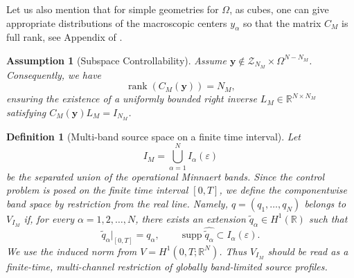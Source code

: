 \documentclass[11pt,a4paper]{article}
\numberwithin{equation}{section}
\newtheorem{assumption}{Assumption}
\newtheorem{definition}{Definition}
\newcommand{\rankrev}[1]{{\color{rankclarification}#1}}
\begin{document}
\noindent Let us also mention that for simple geometries for $\Omega$, as cubes, one can give appropriate distributions of the macroscopic centers $y_\alpha$ so that the matrix $C_M$ is full rank, see Appendix of \cite{RodriguesSiniHeat}.

\begin{assumption}[Subspace Controllability]
\label{ass:Minnaert-coupling}
Assume $\mathbf{y} \notin \mathcal{Z}_{N_M} \times \Omega^{N-N_M}$. Consequently, we have $$\operatorname{rank}(C_M(\mathbf{y})) = N_M,$$ ensuring the existence of a uniformly bounded right inverse $L_M \in \mathbb{R}^{N \times N_M}$ satisfying $C_M(\mathbf y)L_M=I_{N_M}$.
\end{assumption}


\begin{definition}[Multi-band source space on a finite time interval]
\label{def:multi-band-source-space}
Let
\[
        I_M=\bigcup_{\alpha=1}^N I_\alpha(\varepsilon)
\]
be the separated union of the operational Minnaert bands. Since the control problem is posed on the finite time interval $[0,T]$, we define the componentwise band space by restriction from the real line. Namely, $q=(q_1,\ldots,q_N)$ belongs to $V_{I_M}$ if, for every $\alpha =1,2,\ldots,N$, there exists an extension $\widetilde q_\alpha\in H^1(\mathbb R)$ such that
\[
        \widetilde q_\alpha|_{[0,T]}=q_\alpha,
        \qquad
        \operatorname{supp}\widehat{\widetilde q_\alpha}
        \subset I_\alpha(\varepsilon).
\]
We use the induced norm from $V=H^1(0,T;\mathbb R^N)$. Thus $V_{I_M}$ should be read as a finite-time, multi-channel restriction of globally band-limited source profiles.
\end{definition}
\end{document}
